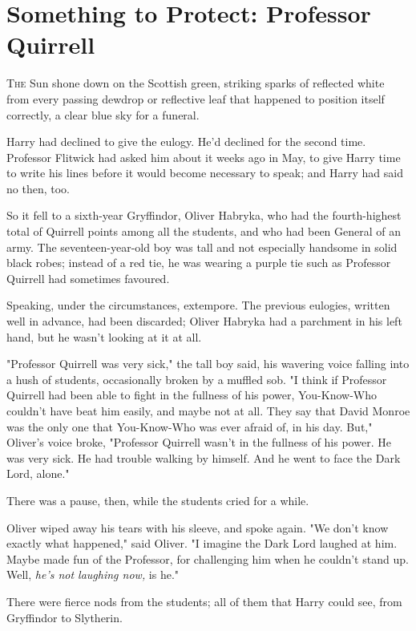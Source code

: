 \chapter{Something to Protect: Professor Quirrell}

\lettrine{T}{he} Sun shone
down on the Scottish green, striking sparks of reflected white from every
passing dewdrop or reflective leaf that happened to position itself correctly,
a clear blue sky for a funeral.

Harry had declined to give the eulogy. He'd declined for the second time.
Professor Flitwick had asked him about it weeks ago in May, to give Harry time
to write his lines before it would become necessary to speak; and Harry had
said no then, too.

So it fell to a sixth-year Gryffindor, Oliver Habryka, who had the
fourth-highest total of Quirrell points among all the students, and who had
been General of an army. The seventeen-year-old boy was tall and not especially
handsome in solid black robes; instead of a red tie, he was wearing a purple
tie such as Professor Quirrell had sometimes favoured.

Speaking, under the circumstances, extempore. The previous eulogies,
written well in advance, had been discarded; Oliver Habryka had a parchment in
his left hand, but he wasn't looking at it at all.

"Professor Quirrell was very sick," the tall boy said, his wavering voice
falling into a hush of students, occasionally broken by a muffled sob. "I think
if Professor Quirrell had been able to fight in the fullness of his power,
You-Know-Who couldn't have beat him easily, and maybe not at all. They say that
David Monroe was the only one that You-Know-Who was ever afraid of, in his day.
But," Oliver's voice broke, "Professor Quirrell wasn't in the fullness of his
power. He was very sick. He had trouble walking by himself. And he went to face
the Dark Lord, alone."

There was a pause, then, while the students cried for a while.

Oliver wiped away his tears with his sleeve, and spoke again. "We don't know
exactly what happened," said Oliver. "I imagine the Dark Lord laughed at him.
Maybe made fun of the Professor, for challenging him when he couldn't stand up.
Well, \emph{he's not laughing now,} is he."

There were fierce nods from the students; all of them that Harry could see,
from Gryffindor to Slytherin.

